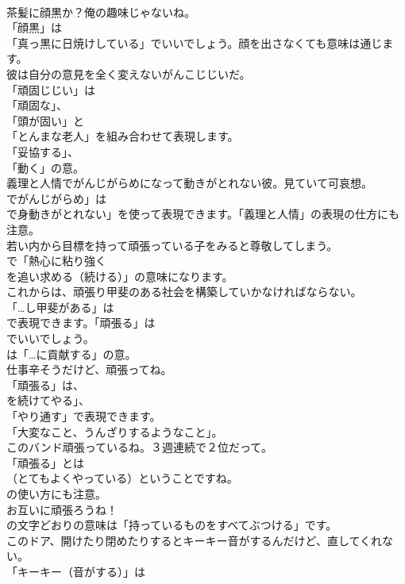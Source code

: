 \documentclass[8pt]{extreport}
\begin{document}
\begin{CJK}{UTF8}{min}
\\	茶髪に顔黒か？俺の趣味じゃないね。 
\\	「顔黒」は
\\	「真っ黒に日焼けしている」でいいでしょう。顔を出さなくても意味は通じます。	
\\	彼は自分の意見を全く変えないがんこじじいだ。 
\\	「頑固じじい」は
\\	「頑固な」、
\\	「頭が固い」と
\\	「とんまな老人」を組み合わせて表現します。
\\	「妥協する」、
\\	「動く」の意。	
\\	義理と人情でがんじがらめになって動きがとれない彼。見ていて可哀想。 
\\	でがんじがらめ」は
\\	で身動きがとれない」を使って表現できます。「義理と人情」の表現の仕方にも注意。	
\\	若い内から目標を持って頑張っている子をみると尊敬してしまう。 
\\	で「熱心に粘り強く 
\\	を追い求める（続ける）」の意味になります。	
\\	これからは、頑張り甲斐のある社会を構築していかなければならない。 
\\	「…し甲斐がある」は 
\\	で表現できます。「頑張る」は 
\\	でいいでしょう。
\\	は「…に貢献する」の意。	
\\	仕事辛そうだけど、頑張ってね。 
\\	「頑張る」は、
\\	を続けてやる」、
\\	「やり通す」で表現できます。
\\	「大変なこと、うんざりするようなこと」。	
\\	このバンド頑張っているね。３週連続で２位だって。 
\\	「頑張る」とは
\\	（とてもよくやっている）ということですね。
\\	の使い方にも注意。	
\\	お互いに頑張ろうね！ 
\\	の文字どおりの意味は「持っているものをすべてぶつける」です。	
\\	このドア、開けたり閉めたりするとキーキー音がするんだけど、直してくれない。 
\\	「キーキー（音がする）」は

\end{CJK}
\end{document}
